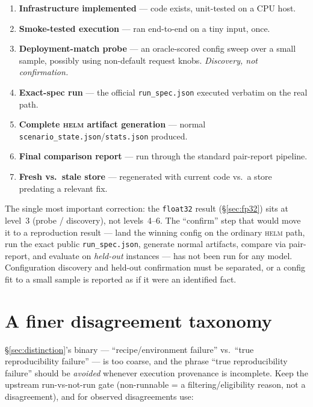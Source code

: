 \documentclass[11pt]{report}
\newcommand{\code}[1]{\texttt{#1}}
\newcommand{\file}[1]{\texttt{#1}}
\begin{document}
\begin{enumerate}[nosep]
  \item \textbf{Infrastructure implemented} --- code exists, unit-tested on a CPU host.
  \item \textbf{Smoke-tested execution} --- ran end-to-end on a tiny input, once.
  \item \textbf{Deployment-match probe} --- an oracle-scored config sweep over a small
        sample, possibly using non-default request knobs. \emph{Discovery, not
        confirmation.}
  \item \textbf{Exact-spec run} --- the official \file{run\_spec.json} executed
        verbatim on the real path.
  \item \textbf{Complete \textsc{helm} artifact generation} --- normal
        \file{scenario\_state.json}/\file{stats.json} produced.
  \item \textbf{Final comparison report} --- run through the standard pair-report
        pipeline.
  \item \textbf{Fresh vs.\ stale store} --- regenerated with current code vs.\ a store
        predating a relevant fix.
\end{enumerate}

The single most important correction: the \code{float32} result (\S\ref{sec:fp32})
sits at level~3 (probe / discovery), not levels~4--6. The ``confirm'' step that
would move it to a reproduction result --- land the winning config on the ordinary
\textsc{helm} path, run the exact public \file{run\_spec.json}, generate normal
artifacts, compare via pair-report, and evaluate on \emph{held-out} instances --- has
not been run for any model. Configuration discovery and held-out confirmation must be
separated, or a config fit to a small sample is reported as if it were an identified
fact.

\section{A finer disagreement taxonomy}

\S\ref{sec:distinction}'s binary --- ``recipe/environment failure'' vs.\ ``true
reproducibility failure'' --- is too coarse, and the phrase ``true reproducibility
failure'' should be \emph{avoided} whenever execution provenance is incomplete. Keep
the upstream run-vs-not-run gate (non-runnable = a filtering/eligibility reason, not
a disagreement), and for observed disagreements use:
\end{document}

